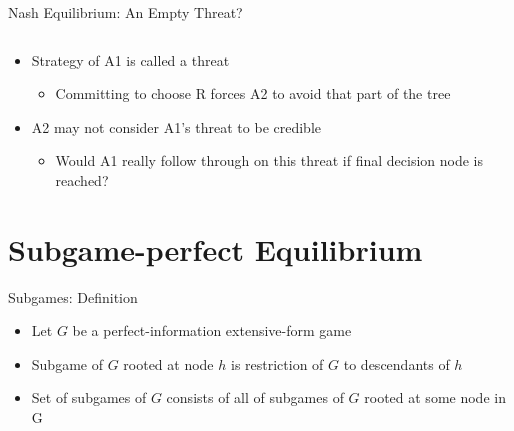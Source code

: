 \documentclass[11pt,aspectratio=169,handout]{beamer}
\begin{document}
\begin{frame}{Nash Equilibrium: An Empty Threat?}
\begin{columns}
\begin{column}{0.4\textwidth}
    \end{column}
   \end{columns}
   \vspace{1cm}
   \begin{itemize}
    \item<3-> Strategy of A1 is called a \alert{threat}
    \begin{itemize}
     \item Committing to choose R forces A2 to avoid that part of the tree
    \end{itemize}
    \item<4-> A2 may not consider A1's threat to be \alert{credible}
    \begin{itemize}
     \item Would A1 really follow through on this threat if final decision node is reached?
    \end{itemize}
   \end{itemize}
  \end{frame}


 \section{Subgame-perfect Equilibrium}
 
  \begin{frame}{Subgames: Definition}
   \begin{itemize}
   \setlength{\itemsep}{1.5em}
    \item Let $G$ be a perfect-information extensive-form game
    \item \alert{Subgame} of $G$ rooted at node $h$ is restriction of $G$ to descendants of $h$
    \item Set of subgames of $G$ consists of all of subgames of $G$ rooted at some node in G
   \end{itemize}
  \end{frame}
\end{document}
